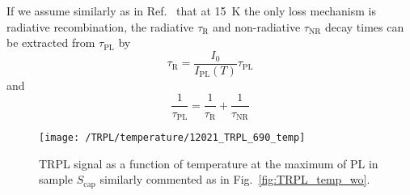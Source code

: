 If we assume similarly as in Ref.~\citep{t_alvarez} that at 15~K the only loss mechanism is radiative recombination, the radiative $\tau_\mathrm{R}$ and non-radiative $\tau_\mathrm{NR}$ decay times can be extracted from $\tau_\mathrm{PL}$ by
%
\begin{equation}
\tau_\mathrm{R}=\frac{I_0}{I_\mathrm{PL}(T)}\tau_\mathrm{PL} \label{eq:tau_R_fromPL}
\end{equation}
and
\begin{equation}
\frac{1}{\tau_\mathrm{PL}}=\frac{1}{\tau_\mathrm{R}} + \frac{1}{\tau_\mathrm{NR}}
\end{equation}
%
\begin{figure}
	\centering
	\texttt{[image: /TRPL/temperature/12021\_TRPL\_690\_temp]}
	\caption{TRPL signal as a function of temperature at the maximum of PL in sample $S_\mathrm{cap}$ similarly commented as in Fig.~\ref{fig:TRPL_temp_wo}.}
	\label{fig:TRPL_temp_c}
\end{figure}
%

